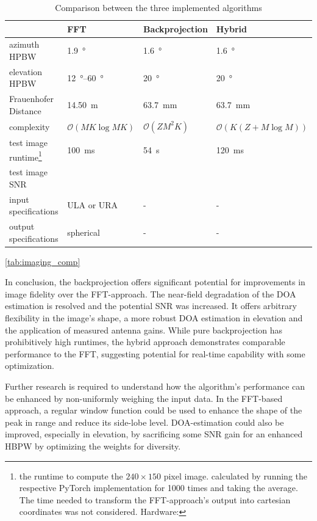 \begin{table}
    \begin{tabular}{llll}
        \hline
        & \textbf{FFT} & \textbf{Backprojection} & \textbf{Hybrid} \\
        \hline
        azimuth HPBW& \SI{1.9}{\degree} & \SI{1.6}{\degree} & \SI{1.6}{\degree} \\
        elevation HPBW & \SIrange{12}{60}{\degree} & \SI{20}{\degree} & \SI{20}{\degree} \\
        Frauenhofer Distance & \SI{14.50}{\m} & \SI{63.7}{\mm} & \SI{63.7}{\mm} \\
        complexity & $\mathcal O (MK \log MK)$ & $\mathcal O(ZM^2K)$ & $\mathcal O \left(K(Z + M\log M) \right)$ \\
        test image runtime\footnote{
            the runtime to compute the $240 \times 150$ pixel
            image.
            calculated by running the respective 
            PyTorch implementation for 1000 times and taking the average.
            The time needed to transform the FFT-approach's output into cartesian coordinates was not considered.
            Hardware: 
        } & \SI{100}{\ms} & \SI{54}{\s} & \SI{120}{\ms} \\
        test image SNR &&& \\
        input specifications & ULA or URA & - & - \\
        output specifications & spherical & - & - \\
    \end{tabular}
    \caption{Comparison between the three implemented algorithms}
    \ref{tab:imaging_comp}
\end{table}

In conclusion, the backprojection offers significant potential for improvements in image fidelity over the FFT-approach.
The near-field degradation of the DOA estimation is resolved and the potential SNR was increased.
It offers arbitrary flexibility in the image's shape,
a more robust DOA estimation in elevation and the application of measured antenna gains.
While pure backprojection has prohibitively high runtimes,
the hybrid approach demonstrates comparable performance to the FFT,
suggesting potential for real-time capability with some optimization.

Further research is required to understand how the algorithm's performance can be enhanced
by non-uniformly weighing the input data. In the FFT-based approach,
a regular window function could be used to enhance the shape of the peak in range and reduce its side-lobe level.
DOA-estimation could also be improved, especially in elevation,
by sacrificing some SNR gain for an enhanced HBPW by optimizing the weights for diversity.

